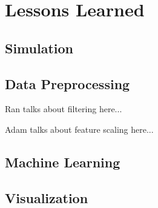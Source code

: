 \section{Lessons Learned}
\label{lessons}

\subsection{Simulation}


\subsection{Data Preprocessing}

Ran talks about filtering here...

Adam talks about feature scaling here...

\subsection{Machine Learning}

\subsection{Visualization}